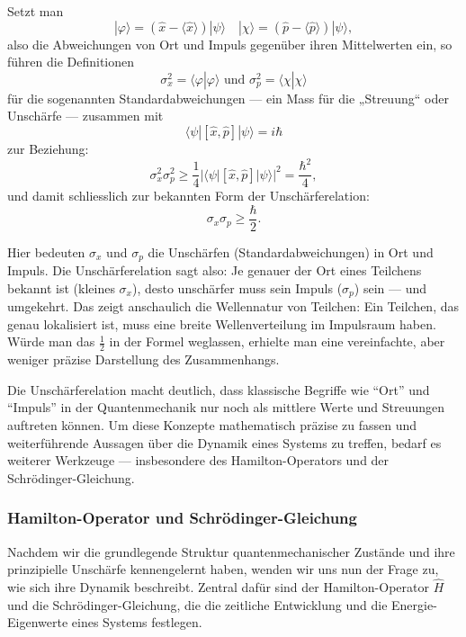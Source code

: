 	Setzt man
	\begin{equation}
		|\varphi\rangle = (\hat{x} - \langle \hat{x} \rangle) |\psi\rangle \quad |\chi\rangle = (\hat{p} - \langle \hat{p} \rangle) | \psi\rangle,
	\end{equation}
	also die Abweichungen von Ort und Impuls gegenüber ihren Mittelwerten ein, so führen die Definitionen
	\begin{equation}
		\sigma_x^2 = \langle\varphi | \varphi\rangle \text{ und } \sigma_p^2 = \langle\chi | \chi\rangle
	\end{equation}
	für die sogenannten Standardabweichungen --- ein Mass für die „Streuung“ oder Unschärfe --- zusammen mit
	\begin{equation}
		\langle\psi | [\hat{x},\hat{p}] | \psi\rangle = i\hbar
	\end{equation}
	zur Beziehung:
	\begin{equation}
		\sigma_x^2 \sigma_p^2 \ge \frac{1}{4} |\langle\psi | [\hat{x},\hat{p}] | \psi\rangle|^2 = \frac{\hbar^2}{4},
	\end{equation}
	und damit schliesslich zur bekannten Form der Unschärferelation:
	\begin{equation}
		\sigma_x \sigma_p \ge \frac{\hbar}{2}.
	\end{equation}

	Hier bedeuten $\sigma_x$ und $\sigma_p$ die Unschärfen (Standardabweichungen) in Ort und Impuls.
	Die Unschärferelation sagt also:
	Je genauer der Ort eines Teilchens bekannt ist (kleines $\sigma_x$), desto unschärfer muss sein Impuls ($\sigma_p$) sein --- und umgekehrt.
	Das zeigt anschaulich die Wellennatur von Teilchen:
	Ein Teilchen, das genau lokalisiert ist, muss eine breite Wellenverteilung im Impulsraum haben.
	Würde man das $\tfrac{1}{2}$ in der Formel weglassen, erhielte man eine vereinfachte, aber weniger präzise Darstellung des Zusammenhangs.

	Die Unschärferelation macht deutlich, dass klassische Begriffe wie ``Ort'' und ``Impuls'' in der Quantenmechanik nur noch als mittlere Werte und Streuungen auftreten können.
	Um diese Konzepte mathematisch präzise zu fassen und weiterführende Aussagen über die Dynamik eines Systems zu treffen, bedarf es weiterer Werkzeuge ---
	insbesondere des Hamilton-Operators und der Schrödinger-Gleichung.

	\subsubsection{Hamilton-Operator und Schrödinger-Gleichung%
	\label{fourier:subsubsection:hamiltonOperatorUndSchroedinger}} 
		Nachdem wir die grundlegende Struktur quantenmechanischer Zustände und ihre prinzipielle Unschärfe kennengelernt haben, wenden wir uns nun der Frage zu, wie sich ihre Dynamik beschreibt.
		Zentral dafür sind der Hamilton-Operator \( \hat{H} \) und die Schrödinger-Gleichung, die die zeitliche Entwicklung und die Energie-Eigenwerte eines Systems festlegen.

